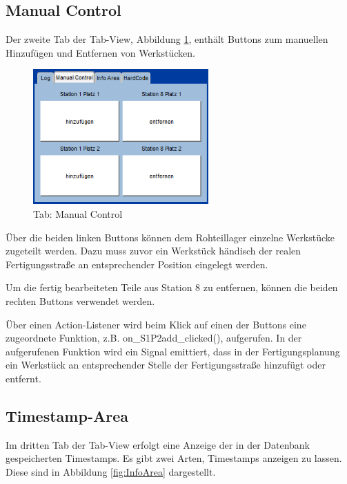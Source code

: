 \subsection{Manual Control}

Der zweite Tab der Tab-View, Abbildung \ref{fig:ManualControl}, enthält Buttons zum manuellen Hinzufügen und Entfernen von Werkstücken. 

\begin{figure}[htb]
    \centering
    \includegraphics[width=0.6\textwidth]{Abbildungen/ManualControl.png}
    \caption{Tab: Manual Control}		
    \label{fig:ManualControl}
\end{figure}

Über die beiden linken Buttons können dem Rohteillager einzelne Werkstücke zugeteilt werden. Dazu muss zuvor ein Werkstück händisch der realen Fertigungsstraße an entsprechender Position eingelegt werden. 

Um die fertig bearbeiteten Teile aus Station 8 zu entfernen, können die beiden rechten Buttons verwendet werden. 

Über einen Action-Listener wird beim Klick auf einen der Buttons eine zugeordnete Funktion, z.B. on\_S1P2add\_clicked(), aufgerufen. In der aufgerufenen Funktion wird ein Signal emittiert, dass in der Fertigungsplanung ein Werkstück an entsprechender Stelle der Fertigungsstraße hinzufügt oder entfernt. 

\subsection{Timestamp-Area}

Im dritten Tab der Tab-View erfolgt eine Anzeige der in der Datenbank gespeicherten Timestamps. Es gibt zwei Arten, Timestamps anzeigen zu lassen. Diese sind in Abbildung \ref{fig:InfoArea} dargestellt. 

